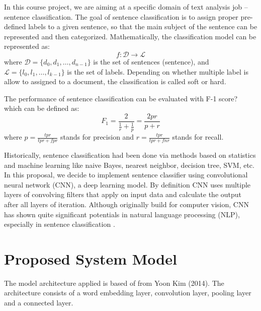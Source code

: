 \documentclass[conference]{IEEEtran}
\begin{document}
    In this course project, we are aiming at a specific domain of text analysis
    job -- sentence classification. The goal of sentence classification is to assign
    proper pre-defined labels to a given sentence, so that the main subject of the 
    sentence can be represented and then categorized\cite{allahyari2017brief}. 
    Mathematically, the classification model can be represented as:
    $$f:\mathcal{D}\rightarrow\mathcal{L}$$
    where $\mathcal{D}=\{d_0, d_1,\ldots, d_{n-1}\}$ is the set of sentences
    (sentence), and $\mathcal{L}=\{l_0, l_1,\ldots, l_{k-1}\}$ is the set of labels.
    Depending on whether multiple label is allow to assigned to a document, the 
    classification is called soft or hard\cite{gopal2010multilabel}.
    
    The performance of sentence classification can be evaluated with F-1 score?
    which can be defined as\cite{forman2003extensive}:
    $$F_1=\frac{2}{\frac{1}{r}+\frac{1}{p}}=\frac{2pr}{p+r}$$
    where $p=\frac{tpr}{tpr+fpr}$ stands for precision and $r=\frac{tpr}{tpr+fnr}$ 
    stands for recall.
    
    Historically, sentence classification had been done via methods based on 
    statistics and machine learning like naive Bayes, nearest neighbor, decision 
    tree, SVM, etc. In this proposal, we decide to implement sentence classifier
    using convolutional neural network (CNN), a deep learning model. By definition
    CNN uses multiple layers of convolving filters that apply on input data and 
    calculate the output after all layers of iteration. Although originally 
    build for computer vision, CNN has shown quite significant potentials in 
    natural language processing (NLP), especially in sentence classification
    \cite{kim2014convolutional}.

\section{Proposed System Model}
The model architecture applied is based of from Yoon Kim (2014). The architecture 
consists of a word embedding layer, convolution layer, pooling layer and a connected
layer. 
\end{document}
